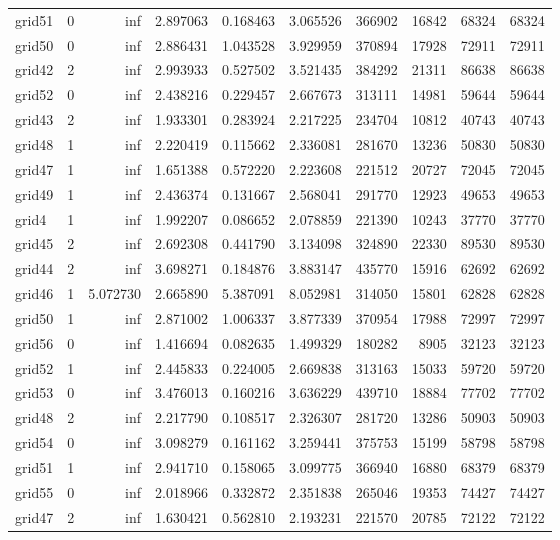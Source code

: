 \begin{longtable}{|l|r|r|r|r|r|r|r|r|r|}
grid51 & 0 & inf & 2.897063 & 0.168463 & 3.065526 & 366902 & 16842 & 68324 & 68324 \\
grid50 & 0 & inf & 2.886431 & 1.043528 & 3.929959 & 370894 & 17928 & 72911 & 72911 \\
grid42 & 2 & inf & 2.993933 & 0.527502 & 3.521435 & 384292 & 21311 & 86638 & 86638 \\
grid52 & 0 & inf & 2.438216 & 0.229457 & 2.667673 & 313111 & 14981 & 59644 & 59644 \\
grid43 & 2 & inf & 1.933301 & 0.283924 & 2.217225 & 234704 & 10812 & 40743 & 40743 \\
grid48 & 1 & inf & 2.220419 & 0.115662 & 2.336081 & 281670 & 13236 & 50830 & 50830 \\
grid47 & 1 & inf & 1.651388 & 0.572220 & 2.223608 & 221512 & 20727 & 72045 & 72045 \\
grid49 & 1 & inf & 2.436374 & 0.131667 & 2.568041 & 291770 & 12923 & 49653 & 49653 \\
grid4 & 1 & inf & 1.992207 & 0.086652 & 2.078859 & 221390 & 10243 & 37770 & 37770 \\
grid45 & 2 & inf & 2.692308 & 0.441790 & 3.134098 & 324890 & 22330 & 89530 & 89530 \\
grid44 & 2 & inf & 3.698271 & 0.184876 & 3.883147 & 435770 & 15916 & 62692 & 62692 \\
grid46 & 1 & 5.072730 & 2.665890 & 5.387091 & 8.052981 & 314050 & 15801 & 62828 & 62828 \\
grid50 & 1 & inf & 2.871002 & 1.006337 & 3.877339 & 370954 & 17988 & 72997 & 72997 \\
grid56 & 0 & inf & 1.416694 & 0.082635 & 1.499329 & 180282 & 8905 & 32123 & 32123 \\
grid52 & 1 & inf & 2.445833 & 0.224005 & 2.669838 & 313163 & 15033 & 59720 & 59720 \\
grid53 & 0 & inf & 3.476013 & 0.160216 & 3.636229 & 439710 & 18884 & 77702 & 77702 \\
grid48 & 2 & inf & 2.217790 & 0.108517 & 2.326307 & 281720 & 13286 & 50903 & 50903 \\
grid54 & 0 & inf & 3.098279 & 0.161162 & 3.259441 & 375753 & 15199 & 58798 & 58798 \\
grid51 & 1 & inf & 2.941710 & 0.158065 & 3.099775 & 366940 & 16880 & 68379 & 68379 \\
grid55 & 0 & inf & 2.018966 & 0.332872 & 2.351838 & 265046 & 19353 & 74427 & 74427 \\
grid47 & 2 & inf & 1.630421 & 0.562810 & 2.193231 & 221570 & 20785 & 72122 & 72122 \\

\end{longtable}
